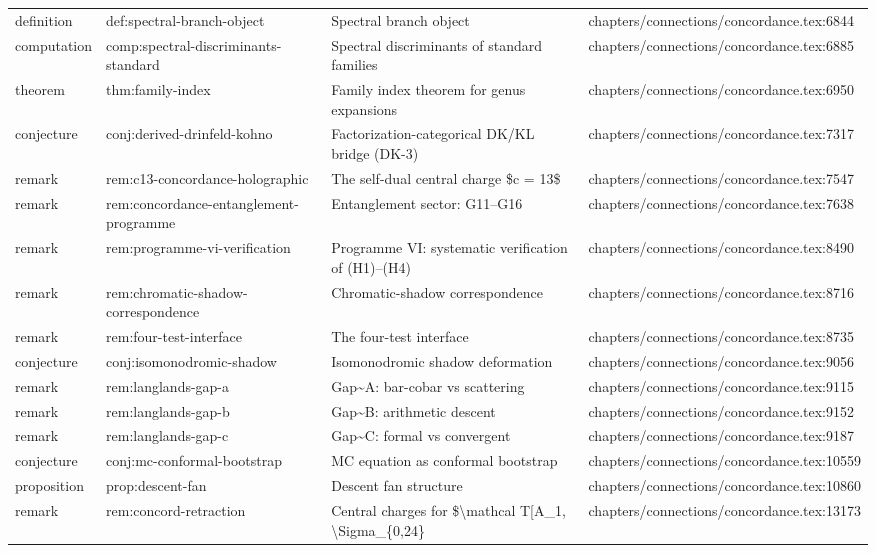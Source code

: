 \documentclass[11pt]{article}
\begin{document}
\begin{longtable}{L{0.10\textwidth}L{0.26\textwidth}L{0.42\textwidth}L{0.22\textwidth}}
definition & def:spectral-branch-object & Spectral branch object & chapters/connections/concordance.tex:6844\\
computation & comp:spectral-discriminants-standard & Spectral discriminants of standard families & chapters/connections/concordance.tex:6885\\
theorem & thm:family-index & Family index theorem for genus expansions & chapters/connections/concordance.tex:6950\\
conjecture & conj:derived-drinfeld-kohno & Factorization-categorical DK/KL bridge (DK-3) & chapters/connections/concordance.tex:7317\\
remark & rem:c13-concordance-holographic & The self-dual central charge \$c = 13\$ & chapters/connections/concordance.tex:7547\\
remark & rem:concordance-entanglement-programme & Entanglement sector: G11--G16 & chapters/connections/concordance.tex:7638\\
remark & rem:programme-vi-verification & Programme VI: systematic verification of (H1)--(H4) & chapters/connections/concordance.tex:8490\\
remark & rem:chromatic-shadow-correspondence & Chromatic-shadow correspondence & chapters/connections/concordance.tex:8716\\
remark & rem:four-test-interface & The four-test interface & chapters/connections/concordance.tex:8735\\
conjecture & conj:isomonodromic-shadow & Isomonodromic shadow deformation & chapters/connections/concordance.tex:9056\\
remark & rem:langlands-gap-a & Gap\textasciitilde{}A: bar-cobar vs scattering & chapters/connections/concordance.tex:9115\\
remark & rem:langlands-gap-b & Gap\textasciitilde{}B: arithmetic descent & chapters/connections/concordance.tex:9152\\
remark & rem:langlands-gap-c & Gap\textasciitilde{}C: formal vs convergent & chapters/connections/concordance.tex:9187\\
conjecture & conj:mc-conformal-bootstrap & MC equation as conformal bootstrap & chapters/connections/concordance.tex:10559\\
proposition & prop:descent-fan & Descent fan structure & chapters/connections/concordance.tex:10860\\
remark & rem:concord-retraction & Central charges for \$\textbackslash{}mathcal T[A\_1, \textbackslash{}Sigma\_\{0,24\} & chapters/connections/concordance.tex:13173\\

\end{longtable}
\end{document}
